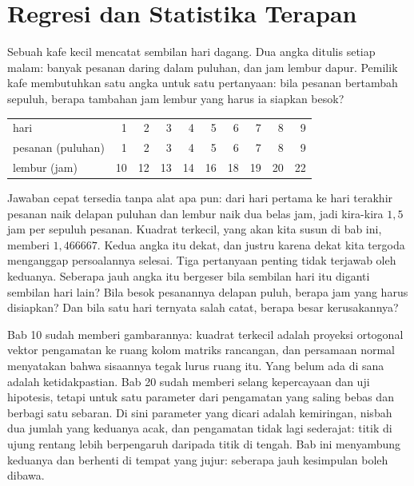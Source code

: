 \chapter{Regresi dan Statistika Terapan}

Sebuah kafe kecil mencatat sembilan hari dagang. Dua angka ditulis setiap malam:
banyak pesanan daring dalam puluhan, dan jam lembur dapur. Pemilik kafe membutuhkan
satu angka untuk satu pertanyaan: bila pesanan bertambah sepuluh, berapa tambahan jam
lembur yang harus ia siapkan besok?

\begin{center}
\small
\begin{tabular}{l*{9}{r}}
\hline
hari               & 1 & 2 & 3 & 4 & 5 & 6 & 7 & 8 & 9 \\
pesanan (puluhan)  & 1 & 2 & 3 & 4 & 5 & 6 & 7 & 8 & 9 \\
lembur (jam)       & 10 & 12 & 13 & 14 & 16 & 18 & 19 & 20 & 22 \\
\hline
\end{tabular}
\end{center}

Jawaban cepat tersedia tanpa alat apa pun: dari hari pertama ke hari terakhir pesanan
naik delapan puluhan dan lembur naik dua belas jam, jadi kira-kira $1{,}5$ jam per
sepuluh pesanan. Kuadrat terkecil, yang akan kita susun di bab ini, memberi
$1{,}466667$. Kedua angka itu dekat, dan justru karena dekat kita tergoda menganggap
persoalannya selesai. Tiga pertanyaan penting tidak terjawab oleh keduanya. Seberapa
jauh angka itu bergeser bila sembilan hari itu diganti sembilan hari lain? Bila besok
pesanannya delapan puluh, berapa jam yang harus disiapkan? Dan bila satu hari ternyata
salah catat, berapa besar kerusakannya?

Bab 10 sudah memberi gambarannya: kuadrat terkecil adalah proyeksi ortogonal vektor
pengamatan ke ruang kolom matriks rancangan, dan persamaan normal menyatakan bahwa
sisaannya tegak lurus ruang itu. Yang belum ada di sana adalah ketidakpastian. Bab 20
sudah memberi selang kepercayaan dan uji hipotesis, tetapi untuk satu parameter dari
pengamatan yang saling bebas dan berbagi satu sebaran. Di sini parameter yang dicari
adalah kemiringan, nisbah dua jumlah yang keduanya acak, dan pengamatan tidak lagi
sederajat: titik di ujung rentang lebih berpengaruh daripada titik di tengah. Bab ini
menyambung keduanya dan berhenti di tempat yang jujur: seberapa jauh kesimpulan boleh
dibawa.

